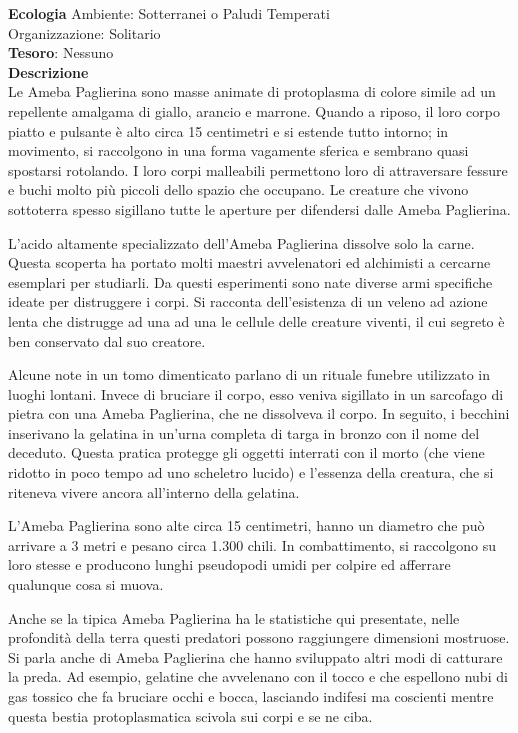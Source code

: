 \begin{multicols}{2}
\textbf{Ecologia}
Ambiente: Sotterranei o Paludi Temperati\\
Organizzazione: Solitario\\
\textbf{Tesoro}: Nessuno\\
\textbf{Descrizione}\\
Le Ameba Paglierina sono masse animate di protoplasma di colore simile ad un repellente amalgama di giallo, arancio e marrone. Quando a riposo, il loro corpo piatto e pulsante è alto circa 15 centimetri e si estende tutto intorno; in movimento, si raccolgono in una forma vagamente sferica e sembrano quasi spostarsi rotolando. I loro corpi malleabili permettono loro di attraversare fessure e buchi molto più piccoli dello spazio che occupano. Le creature che vivono sottoterra spesso sigillano tutte le aperture per difendersi dalle Ameba Paglierina.

L'acido altamente specializzato dell'Ameba Paglierina dissolve solo la carne. Questa scoperta ha portato molti maestri avvelenatori ed alchimisti a cercarne esemplari per studiarli. Da questi esperimenti sono nate diverse armi specifiche ideate per distruggere i corpi. Si racconta dell'esistenza di un veleno ad azione lenta che distrugge ad una ad una le cellule delle creature viventi, il cui segreto è ben conservato dal suo creatore.

Alcune note in un tomo dimenticato parlano di un rituale funebre utilizzato in luoghi lontani. Invece di bruciare il corpo, esso veniva sigillato in un sarcofago di pietra con una Ameba Paglierina, che ne dissolveva il corpo. In seguito, i becchini inserivano la gelatina in un'urna completa di targa in bronzo con il nome del deceduto. Questa pratica protegge gli oggetti interrati con il morto (che viene ridotto in poco tempo ad uno scheletro lucido) e l'essenza della creatura, che si riteneva vivere ancora all'interno della gelatina.

L'Ameba Paglierina sono alte circa 15 centimetri, hanno un diametro che può arrivare a 3 metri e pesano circa 1.300 chili. In combattimento, si raccolgono su loro stesse e producono lunghi pseudopodi umidi per colpire ed afferrare qualunque cosa si muova.

Anche se la tipica Ameba Paglierina ha le statistiche qui presentate, nelle profondità della terra questi predatori possono raggiungere dimensioni mostruose. Si parla anche di Ameba Paglierina che hanno sviluppato altri modi di catturare la preda. Ad esempio, gelatine che avvelenano con il tocco e che espellono nubi di gas tossico che fa bruciare occhi e bocca, lasciando indifesi ma coscienti mentre questa bestia protoplasmatica scivola sui corpi e se ne ciba.



\end{multicols}
